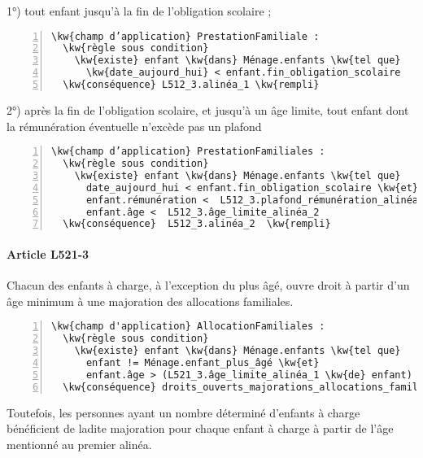 \documentclass[12pt, french]{article}
\newcommand{\kw}[1]{\textbf{\textcolor{OliveGreen}{#1}}}
\begin{document}
1°) tout enfant jusqu’à la fin de l’obligation scolaire ;

\begin{Verbatim}[commandchars=\\\{\}, numbers=left,xleftmargin=5mm, firstnumber=last]
\kw{champ d’application} PrestationFamiliale :
  \kw{règle sous condition}
    \kw{existe} enfant \kw{dans} Ménage.enfants \kw{tel que}
      \kw{date_aujourd_hui} < enfant.fin_obligation_scolaire
  \kw{conséquence} L512_3.alinéa_1 \kw{rempli}
\end{Verbatim}

2°) après la fin de l’obligation scolaire, et jusqu’à un âge limite, tout enfant dont la rémunération éventuelle n’excède pas un plafond

\begin{Verbatim}[commandchars=\\\{\}, numbers=left,xleftmargin=5mm, firstnumber=last]
\kw{champ d’application} PrestationFamiliales :
  \kw{règle sous condition}
    \kw{existe} enfant \kw{dans} Ménage.enfants \kw{tel que}
      date_aujourd_hui < enfant.fin_obligation_scolaire \kw{et}
      enfant.rémunération <  L512_3.plafond_rémunération_alinéa_2 \kw{ou}
      enfant.âge <  L512_3.âge_limite_alinéa_2
  \kw{conséquence}  L512_3.alinéa_2  \kw{rempli}
\end{Verbatim}

\paragraph{Article L521-3}

Chacun des enfants à charge, à l'exception du plus âgé, ouvre droit à partir d'un âge minimum à une majoration des allocations familiales.

\begin{Verbatim}[commandchars=\\\{\}, numbers=left,xleftmargin=5mm, firstnumber=last]
\kw{champ d'application} AllocationFamiliales :
  \kw{règle sous condition}
    \kw{existe} enfant \kw{dans} Ménage.enfants \kw{tel que}
      enfant != Ménage.enfant_plus_âgé \kw{et}
      enfant.âge > (L521_3.âge_limite_alinéa_1 \kw{de} enfant)
  \kw{conséquence} droits_ouverts_majorations_allocations_familiales \kw{rempli}
\end{Verbatim}


Toutefois, les personnes ayant un nombre déterminé d'enfants à charge bénéficient de ladite majoration pour chaque enfant à charge à partir de l'âge mentionné au premier alinéa.
\end{document}
